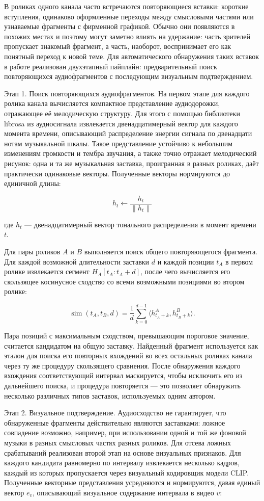 \documentclass[times]{itmo-student-thesis}
\begin{document}
В роликах одного канала часто встречаются повторяющиеся вставки: короткие вступления, одинаково оформленные переходы между смысловыми частями или узнаваемые фрагменты с фирменной графикой. Обычно они появляются в похожих местах и поэтому могут заметно влиять на удержание: часть зрителей пропускает знакомый фрагмент, а часть, наоборот, воспринимает его как понятный переход к новой теме. Для автоматического обнаружения таких вставок в работе реализован двухэтапный пайплайн: предварительный поиск повторяющихся аудиофрагментов с последующим визуальным подтверждением.

Этап 1. Поиск повторяющихся аудиофрагментов. На первом этапе для каждого ролика канала вычисляется компактное представление аудиодорожки, отражающее её мелодическую структуру. Для этого с помощью библиотеки librosa из аудиосигнала извлекается двенадцатимерный вектор для каждого момента времени, описывающий распределение энергии сигнала по двенадцати нотам музыкальной шкалы. Такое представление устойчиво к небольшим изменениям громкости и тембра звучания, а также точно отражает мелодический рисунок: одна и та же музыкальная заставка, проигранная в разных роликах, даёт практически одинаковые векторы. Полученные векторы нормируются до единичной длины:

\[
h_t \leftarrow \frac{h_t}{\lVert h_t \rVert}
\]

где $h_t$ — двенадцатимерный вектор тонального распределения в момент времени $t$.

Для пары роликов $A$ и $B$ выполняется поиск общего повторяющегося фрагмента. Для каждой возможной длительности заставки $d$ и каждой позиции $t_A$ в первом ролике извлекается сегмент $H_A[t_A:t_A+d]$, после чего вычисляется его скользящее косинусное сходство со всеми возможными позициями во втором ролике:

\[
\operatorname{sim}(t_A,t_B,d)=\frac{1}{d}\sum_{k=0}^{d-1}\langle h^A_{t_A+k}, h^B_{t_B+k}\rangle.
\]

Пара позиций с максимальным сходством, превышающим пороговое значение, считается кандидатом на общую заставку. Найденный фрагмент используется как эталон для поиска его повторных вхождений во всех остальных роликах канала через ту же процедуру скользящего сравнения. После обнаружения каждого вхождения соответствующий интервал маскируется, чтобы исключить его из дальнейшего поиска, и процедура повторяется — это позволяет обнаружить несколько различных типов заставок, используемых одним автором.

Этап 2. Визуальное подтверждение. Аудиосходство не гарантирует, что обнаруженные фрагменты действительно являются заставками: ложное совпадение возможно, например, при использовании одной и той же фоновой музыки в разных смысловых частях разных роликов. Для отсева ложных срабатываний реализован второй этап на основе визуальных признаков. Для каждого кандидата равномерно по интервалу извлекается несколько кадров, каждый из которых пропускается через визуальный кодировщик модели CLIP. Полученные векторные представления усредняются и нормируются, давая единый вектор $e_v$, описывающий визуальное содержание интервала в видео $v$:
\end{document}
